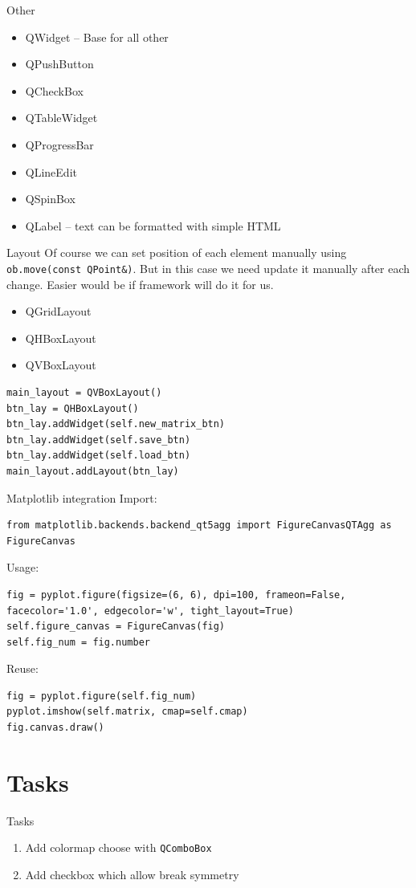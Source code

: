 \documentclass[11pt,usenames,dvipsnames]{beamer}
\begin{document}
\begin{frame}[c]{Other}
  \begin{itemize}
    \item QWidget – Base for all other
    \item QPushButton
    \item QCheckBox 
    \item QTableWidget
    \item QProgressBar
    \item QLineEdit
    \item QSpinBox
    \item QLabel – text can be formatted with simple HTML
  \end{itemize}
\end{frame}
\begin{frame}[fragile,c]{Layout}
  Of course we can set position of each element manually using \lstinline|ob.move(const QPoint&)|. 
  But in this case we need update it manually after each change. Easier would be if framework will do it for us.  
  \begin{itemize}
    \item QGridLayout
    \item QHBoxLayout
    \item QVBoxLayout 
  \end{itemize}
\begin{lstlisting}
main_layout = QVBoxLayout()
btn_lay = QHBoxLayout()
btn_lay.addWidget(self.new_matrix_btn)
btn_lay.addWidget(self.save_btn)
btn_lay.addWidget(self.load_btn)
main_layout.addLayout(btn_lay)
\end{lstlisting}
\end{frame}
\begin{frame}[fragile,c]{Matplotlib integration}
  Import:
  \begin{lstlisting}
from matplotlib.backends.backend_qt5agg import FigureCanvasQTAgg as FigureCanvas
  \end{lstlisting}
  Usage:
  \begin{lstlisting}
fig = pyplot.figure(figsize=(6, 6), dpi=100, frameon=False, facecolor='1.0', edgecolor='w', tight_layout=True)
self.figure_canvas = FigureCanvas(fig)
self.fig_num = fig.number
  \end{lstlisting}
  Reuse:
  \begin{lstlisting}
fig = pyplot.figure(self.fig_num)
pyplot.imshow(self.matrix, cmap=self.cmap)
fig.canvas.draw()
  \end{lstlisting}
\end{frame}
\section{Tasks}
\begin{frame}[c]{Tasks}
  \begin{enumerate}
    \item Add colormap choose with \lstinline|QComboBox|
    \item Add checkbox which allow break symmetry  
  \end{enumerate}
\end{frame}
\end{document}
